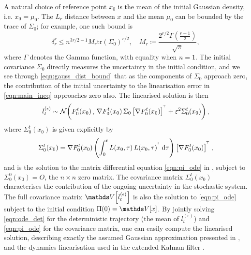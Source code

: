 A natural choice of reference point \(x_0\) is the mean of the initial Gaussian density, i.e. \(x_0 = \mu_0\).
The \(L_r\) distance between \(x\) and the mean \(\mu_0\) can be bounded by the trace of \(\Sigma_0\); for example, one such bound is
\begin{equation}\label{eqn:gauss_dist_bound}
	\delta_r^{r} \leq n^{3r/2 - 1} M_r \mathrm{tr}\left(\Sigma_0\right)^{r/2}, \quad M_r \coloneqq \frac{2^{r/2}\Gamma\!\left(\frac{r + 1}{2}\right)}{\sqrt{\pi}},
\end{equation}
where \(\Gamma\) denotes the Gamma function, with equality when \(n = 1\).
The initial covariance \(\Sigma_0\) directly measures the uncertainty in the initial condition, and we see through \cref{eqn:gauss_dist_bound} that as the components of \(\Sigma_0\) approach zero, the contribution of the initial uncertainty to the linearisation error in \cref{eqn:main_ineq} approaches zero also.
The linearised solution is then
\[
	l_t^{(\epsilon)} \sim\mathcal{N}\!\left(F_0^t\!\left(x_0\right), \, \nabla F_0^t\!\left(x_0\right) \Sigma_0\left[\nabla F_0^t\!\left(x_0\right)\right]^{^{\!\top}} + \varepsilon^2 \Sigma_0^t\!\left(x_0\right)\right),
\]
where \(\Sigma_0^t\!\left(x_0\right)\) is given explicitly by
\begin{equation}\label{eqn:sigma_def}
	\Sigma_0^t\!\left(x_0\right) = \nabla F_0^t\!\left(x_0\right)\left(\int_0^t{L\!\left(x_0, \tau\right)L\!\left(x_0, \tau\right)^{\T} \dif\tau}\right)\left[\nabla F_0^t\!\left(x_0\right)\right]^{\T},
\end{equation}
and is the solution to the matrix differential equation \cref{eqn:pi_ode} in , subject to \(\Sigma_0^0\!\left(x_0\right) = O\), the \(n \times n\) zero matrix.
The covariance matrix \(\Sigma_0^t\!\left(x_0\right)\) characterises the contribution of the ongoing uncertainty in the stochastic system.
The full covariance matrix \(\var{l_t^{(\epsilon)}}\) is also the solution to \cref{eqn:pi_ode} subject to the initial condition \(\Pi(0) = \var{x}\).
By jointly solving \cref{eqn:ode_det} for the deterministic trajectory (the mean of \(l_t^{(\epsilon)}\)) and \cref{eqn:pi_ode} for the covariance matrix, one can easily compute the linearised solution, describing exactly the assumed Gaussian approximation presented in \citet{SarkkaSolin_2019_AppliedStochasticDifferential}, and the dynamics linearisation used in the extended Kalman filter \citep{Jazwinski_2014_StochasticProcessesFiltering}.


